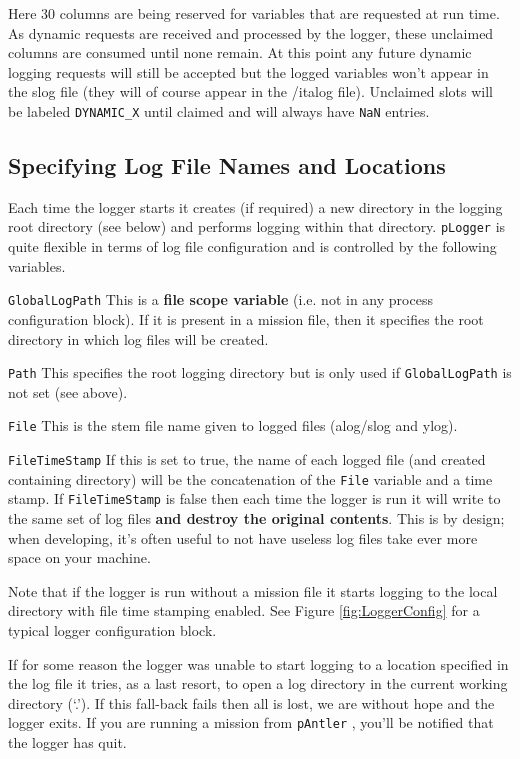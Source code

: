 \documentclass[a4paper,10pt]{article}
\newcommand{\Code}[1]{\texttt{#1} }
\newcommand{\code}[1]{\Code{#1} }
\begin{document}
Here 30 columns are being reserved for variables that are requested at run time. As dynamic requests are received and processed by the logger, these unclaimed columns are consumed until none remain. At this point any future dynamic logging requests will still be accepted but the logged variables won't appear in the slog file (they will of course appear in the {/it{alog}} file). Unclaimed slots will be labeled \code{DYNAMIC\_X} until claimed and will always have \code{NaN} entries.


\subsection{Specifying Log File Names and Locations}\label{Sec:Places}

Each time the logger starts it creates (if required) a new directory in the logging root directory (see below) and performs logging within that directory. \code{pLogger} is quite flexible in terms of log file configuration and is controlled by the following variables.

\begin{description}
\item{\code{GlobalLogPath}} This is a {\textbf{file scope variable}} (i.e. not in any process configuration block). If it is present in a mission file, then it specifies the root directory in which log files will be created.
\item{\code{Path}} This specifies the root logging directory but is only used if \code{GlobalLogPath} is not set (see above).
\item{\code{File}} This is the stem file name given to logged files (alog/slog and ylog).
\item{\code{FileTimeStamp}} If this is set to true, the name of  each logged file (and created containing directory) will be the concatenation of the \code{File} variable and a time stamp. If \code{FileTimeStamp} is false then each time the logger is run it will write to the same set of log files {\textbf{and destroy the original contents}}. This is by design; when developing, it's often useful to not have useless log files take ever more space on your machine.
\end{description}

Note that if the logger is run without a mission file it starts logging to the local directory with file time stamping enabled. See Figure \ref{fig:LoggerConfig} for a typical logger configuration block.

If for some reason the logger was unable to start logging to a location specified in the log file it tries, as a last resort, to open a log directory in the current working directory (`.'). If this fall-back fails then all is lost, we are without hope and the logger exits. If you are running a mission from \code{pAntler}, you'll be notified that the logger has quit.
\end{document}
